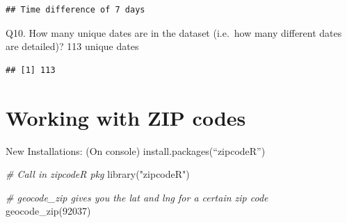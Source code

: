 \documentclass[
]{article}
\newenvironment{Shaded}{\begin{snugshade}}{\end{snugshade}}
\newcommand{\CommentTok}[1]{\textcolor[rgb]{0.56,0.35,0.01}{\textit{#1}}}
\newcommand{\FunctionTok}[1]{\textcolor[rgb]{0.00,0.00,0.00}{#1}}
\newcommand{\NormalTok}[1]{#1}
\newcommand{\SpecialCharTok}[1]{\textcolor[rgb]{0.00,0.00,0.00}{#1}}
\newcommand{\StringTok}[1]{\textcolor[rgb]{0.31,0.60,0.02}{#1}}
\begin{document}
\begin{Shaded}
\end{Shaded}

\begin{verbatim}
## Time difference of 7 days
\end{verbatim}

Q10. How many unique dates are in the dataset (i.e.~how many different
dates are detailed)? 113 unique dates

\begin{Shaded}
\end{Shaded}

\begin{verbatim}
## [1] 113
\end{verbatim}

\hypertarget{working-with-zip-codes}{%
\section{Working with ZIP codes}\label{working-with-zip-codes}}

New Installations: (On console) install.packages(``zipcodeR'')

\begin{Shaded}
\begin{Highlighting}[]
\CommentTok{\# Call in zipcodeR pkg}
\FunctionTok{library}\NormalTok{(}\StringTok{"zipcodeR"}\NormalTok{)}
\end{Highlighting}
\end{Shaded}

\begin{Shaded}
\begin{Highlighting}[]
\CommentTok{\# geocode\_zip gives you the lat and lng for a certain zip code}
\FunctionTok{geocode\_zip}\NormalTok{(}\StringTok{\textquotesingle{}92037\textquotesingle{}}\NormalTok{)}
\end{Highlighting}
\end{Shaded}
\end{document}

